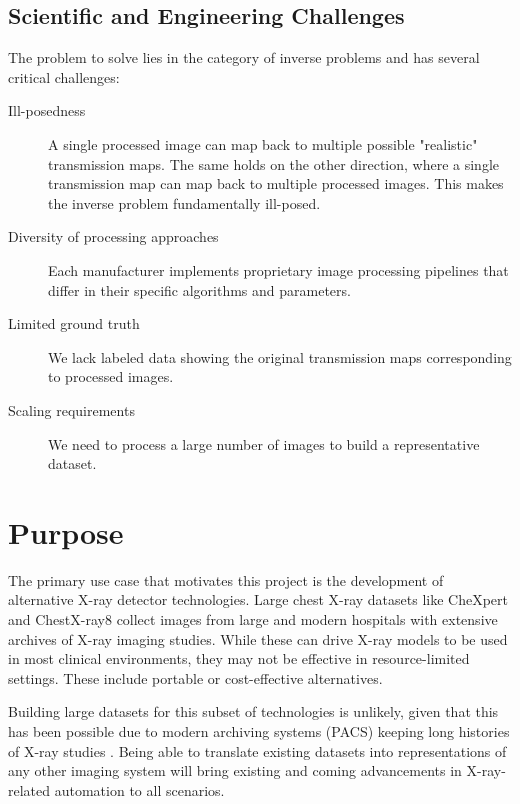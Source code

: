 \documentclass[nomenclature, english, bibtex]{kththesis}
\numberwithin{listing}{chapter}
\begin{document}
\subsection{Scientific and Engineering Challenges}

The problem to solve lies in the category of inverse problems and has several critical challenges:

\begin{description}
    \item[Ill-posedness]
        A single processed image can map back to multiple possible "realistic" transmission maps.
        The same holds on the other direction, where a single transmission map can map back to multiple processed images.
       This makes the inverse problem fundamentally ill-posed.
    \item[Diversity of processing approaches]
        Each manufacturer implements proprietary image processing pipelines that differ in their specific algorithms and parameters.
    \item[Limited ground truth] We lack labeled data showing the original transmission maps corresponding to processed images.
    \item[Scaling requirements] We need to process a large number of images to build a representative dataset.
\end{description}

\section{Purpose}

The primary use case that motivates this project is the development of alternative X-ray detector technologies.
Large chest X-ray datasets like CheXpert \cite{chexpert} and ChestX-ray8 \cite{nih} collect images from large
and modern hospitals with extensive archives of X-ray imaging studies. While these can drive X-ray models to be
used in most clinical environments, they may not be effective in resource-limited settings. These include portable
or cost-effective alternatives.

Building large datasets for this subset of technologies is unlikely, given that this has been possible due to
modern archiving systems (PACS) keeping long histories of X-ray studies \cite[p.~3462]{nih}. Being able
to translate existing datasets into representations of any other imaging system will bring existing and
coming advancements in X-ray-related automation to all scenarios.
\end{document}
